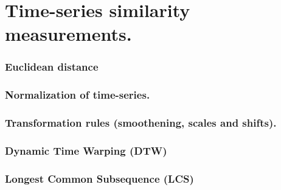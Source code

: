 \chapter{Time-series similarity measurements.}

\subsection{Euclidean distance}

\subsection{Normalization of time-series.}

\subsection{Transformation rules (smoothening, scales and shifts).}

\subsection{Dynamic Time Warping (DTW)}

\subsection{Longest Common Subsequence (LCS) }